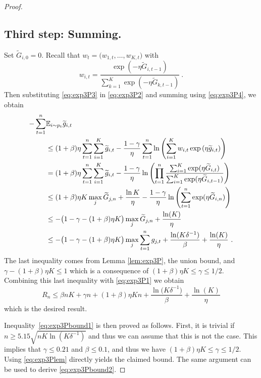 \begin{proof}
\subsection*{Third step: Summing.}
%
Set $\tilde{G}_{i,0} = 0$. Recall that $w_t=\bigl(w_{1,t},\hdots,w_{K,t}\bigr)$ with 
\begin{equation} \label{eq:exp3P4}
w_{i,t} = \frac{\exp{\left(- \eta \tilde{G}_{i,t-1}\right)}}{\sum_{k=1}^K \exp{\left(- \eta \tilde{G}_{k,t-1}\right)}}~.
\end{equation}
Then substituting \eqref{eq:exp3P3} in \eqref{eq:exp3P2} and summing using \eqref{eq:exp3P4}, we obtain
%
\begin{align*}
- \sum_{t=1}^n &\mathbb{E}_{i \sim p_t} \widetilde{g}_{i,t} \\
& \leq (1+\beta) \eta \sum_{t=1}^n \sum_{i=1}^K \widetilde{g}_{i,t} - \frac{1-\gamma}{\eta} \sum_{t=1}^n \ln \left( \sum_{i=1}^K w_{i,t} \exp{\left( \eta \widetilde{g}_{i,t} \right)}  \right) \\
& = (1+\beta) \eta \sum_{t=1}^n \sum_{i=1}^K \widetilde{g}_{i,t} - \frac{1-\gamma}{\eta} \ln \left( \prod_{t=1}^n \frac{\sum_{i=1}^K \exp(\eta \widetilde{G}_{i,t})}{\sum_{i=1}^K \exp(\eta \widetilde{G}_{i,t-1})} \right) \\
& \leq (1+\beta) \eta K \max_j \widetilde{G}_{j,n} + \frac{\ln K}{\eta} - \frac{1-\gamma}{\eta} \ln \left( \sum_{t=1}^n \exp(\eta \widetilde{G}_{i,n}) \right) \\
& \leq - \bigl(1 - \gamma - (1+\beta) \eta K\bigr) \max_j \widetilde{G}_{j,n} + \frac{\ln(K)}{\eta} \\
& \leq - \bigl(1 - \gamma - (1+\beta) \eta K\bigr) \max_j \sum_{t=1}^n g_{j,t} + \frac{\ln(K \delta^{-1})}{\beta} + \frac{\ln(K)}{\eta}~.
\end{align*}
The last inequality comes from Lemma \ref{lem:exp3P}, the union bound, and $\gamma - (1+\beta) \eta K \leq 1$ which is a consequence of $(1+\beta) \eta K \leq \gamma \leq 1/2$. Combining this last inequality with \eqref{eq:exp3P1} we obtain
$$R_n \leq \beta n K + \gamma n + (1+\beta) \eta K n + \frac{\ln\bigl(K \delta^{-1}\bigr)}{\beta} + \frac{\ln(K)}{\eta}$$
which is the desired result.

Inequality~\eqref{eq:exp3Pbound1} is then proved as follows. First, it is trivial if $n \geq 5.15 \sqrt{n K \ln(K \delta^{-1})}$ and thus we can assume that this is not the case. This implies that $\gamma \leq 0.21$ and $\beta \leq 0.1$, and thus we have $(1+\beta) \eta K \leq \gamma \leq 1/2$. Using \eqref{eq:exp3Plem} directly yields the claimed bound. The same argument can be used to derive \eqref{eq:exp3Pbound2}.
\end{proof}

